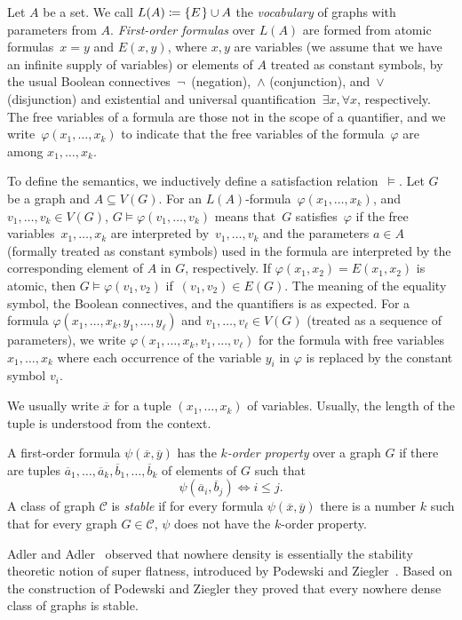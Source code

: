 \documentclass[11pt, fleqn]{article}
\theoremstyle{plain}
\theoremstyle{nonumberplain}
\newcommand{\CCC}{\mathcal{C}}
\newcommand{\tup}[1]{\overline{#1}}
\renewcommand{\phi}{\varphi}
\begin{document}
Let $A$ be a set. We call $L(A)\coloneqq\{E\hspace{0.3mm}\}\cup A$ the \emph{vocabulary}
of graphs with parameters from $A$. \emph{First-order formulas} over $L(A)$ are
formed from atomic formulas~$x=y$ and $E(x,y)$, where $x,y$ are variables (we
assume that we have an infinite supply of variables) or elements of $A$ treated
as constant symbols, by the usual Boolean
connectives~$\neg$~(negation),~$\wedge$ (conjunction), and~$\vee$ (disjunction)
and existential and universal quantification~$\exists x,\forall x$,
respectively.  The free variables of a formula are those not in the scope of a
quantifier, and we write~$\phi(x_1,\ldots,x_k)$ to indicate that the free
variables of the formula~$\phi$ are among $x_1,\ldots,x_k$.

To define the semantics, we inductively define a satisfaction
relation~$\models$. Let $G$ be a graph and $A\subseteq V(G)$. For an
$L(A)$-formula~$\phi(x_1,\ldots,x_k)$, and
$v_1,\ldots,v_k\in V(G)$, $G\models\phi(v_1,\ldots,v_k)$
means that~$G$ satisfies~$\phi$ if the free variables~$x_1,\ldots,x_k$
are interpreted by~$v_1,\ldots,v_k$ and the parameters $a\in A$
(formally treated as constant symbols) used in the formula are
interpreted by the corresponding element of $A$ in $G$, respectively. If
$\phi(x_1,x_2)=E(x_1,x_2)$ is atomic, then $G\models\phi(v_1,v_2)$
if~$(v_1,v_2)\in E(G)$. The meaning of the equality symbol, the
Boolean connectives, and the quantifiers is as expected. For a
formula $\phi(x_1,\ldots, x_k, y_1,\ldots, y_\ell)$ and
$v_1,\ldots, v_\ell\in V(G)$ (treated as a sequence of parameters), we
write $\phi(x_1,\ldots, x_k, v_1,\ldots, v_\ell)$ for the formula with
free variables $x_1,\ldots, x_k$ where each occurrence of the variable
$y_i$ in $\phi$ is replaced by the constant symbol $v_i$.

We usually write $\tup{x}$ for a tuple $(x_1,\ldots, x_k)$ of variables. 
Usually, the length of the tuple is understood from the context. 

A first-order formula $\psi(\tup{x},\tup{y})$ has the \emph{$k$-order property}
over a graph $G$ if there are tuples $\tup{a}_1,\ldots, \tup{a}_k, \tup{b}_1,\ldots, \tup{b}_k$
of elements of $G$ such that \[\psi(\tup{a}_i,\tup{b}_j)\Longleftrightarrow i\leq j.\]
A class of graph $\CCC$ is \emph{stable} if for every formula $\psi(\tup{x},\tup{y})$ there
is a number $k$ such that for every graph $G\in \CCC$, $\psi$ does not have the $k$-order 
property.

Adler and Adler~\cite{adler2014interpreting} observed that nowhere density 
is essentially the stability theoretic notion of super flatness, introduced by
Podewski and Ziegler~\cite{podewski1978stable}. Based on the construction of 
Podewski and Ziegler they proved that every nowhere dense class of graphs is
stable. 
\end{document}
